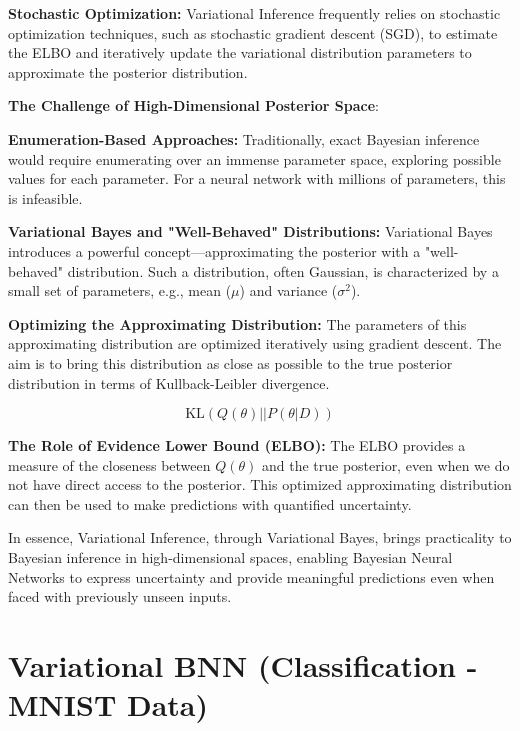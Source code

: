 \documentclass{article}
\begin{document}
\textbf{Stochastic Optimization:}
Variational Inference frequently relies on stochastic optimization techniques, such as stochastic gradient descent (SGD), to estimate the ELBO and iteratively update the variational distribution parameters to approximate the posterior distribution.

\textbf{The Challenge of High-Dimensional Posterior Space}:

\textbf{Enumeration-Based Approaches:}
Traditionally, exact Bayesian inference would require enumerating over an immense parameter space, exploring possible values for each parameter. For a neural network with millions of parameters, this is infeasible.

\textbf{Variational Bayes and "Well-Behaved" Distributions:}
Variational Bayes introduces a powerful concept—approximating the posterior with a "well-behaved" distribution. Such a distribution, often Gaussian, is characterized by a small set of parameters, e.g., mean ($\mu$) and variance ($\sigma^2$).

\textbf{Optimizing the Approximating Distribution:}
The parameters of this approximating distribution are optimized iteratively using gradient descent. The aim is to bring this distribution as close as possible to the true posterior distribution in terms of Kullback-Leibler divergence.

\[\text{KL}(Q(\theta) || P(\theta|D))\]

\textbf{The Role of Evidence Lower Bound (ELBO):}
The ELBO provides a measure of the closeness between $Q(\theta)$ and the true posterior, even when we do not have direct access to the posterior. This optimized approximating distribution can then be used to make predictions with quantified uncertainty.

In essence, Variational Inference, through Variational Bayes, brings practicality to Bayesian inference in high-dimensional spaces, enabling Bayesian Neural Networks to express uncertainty and provide meaningful predictions even when faced with previously unseen inputs.




\section{Variational BNN (Classification - MNIST Data)}
\end{document}
